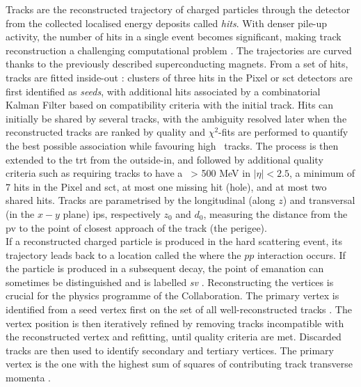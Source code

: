 Tracks are the reconstructed trajectory of charged particles through the detector from the collected localised energy deposits called \textit{hits}. With denser pile-up activity, the number of hits in a single event becomes significant, making track reconstruction a challenging computational problem \cite{ATL-PHYS-PUB-2015-006, ATLAS-tracks-algo,}. The trajectories are curved thanks to the previously described superconducting magnets. From a set of hits, tracks are fitted inside-out \cite{ATLAS-tracks-algo}: clusters of three hits in the Pixel or \gls{sct} detectors are first identified as \textit{seeds}, with additional hits associated by a combinatorial Kalman Filter \cite{10.1115/1.3662552} based on compatibility criteria with the initial track. Hits can initially be shared by several tracks, with the ambiguity resolved later when the reconstructed tracks are ranked by quality and $\chi^2$-fits are performed to quantify the best possible association while favouring high \pt\ tracks. The process is then extended to the \gls{trt} from the outside-in, and followed by additional quality criteria such as requiring tracks to have a \pt\ > 500 MeV in $|\eta| < 2.5$, a minimum of 7 hits in the Pixel and \gls{sct}, at most one missing hit (hole), and at most two shared hits. Tracks are parametrised by the longitudinal (along $z$) and transversal (in the $x-y$ plane) \glspl{ip}, respectively $z_0$ and $d_0$, measuring the distance from the \gls{pv} to the point of closest approach of the track (the perigee). \\

If a reconstructed charged particle is produced in the hard scattering event, its trajectory leads back to a location called the \textit{} \cite{ATLAS:2016nnj} where the $pp$ interaction occurs. If the particle is produced in a subsequent decay, the point of emanation can sometimes be distinguished and is labelled \textit{\gls{sv}} \cite{Kostyukhin:685551}. Reconstructing the vertices is crucial for the physics programme of the Collaboration. The primary vertex is identified from a seed vertex first on the set of all well-reconstructed tracks \cite{ATL-PHYS-PUB-2015-026}. The vertex position is then iteratively refined by removing tracks incompatible with the reconstructed vertex and refitting, until quality criteria are met. Discarded tracks are then used to identify secondary and tertiary vertices. The primary vertex is the one with the highest sum of squares of contributing track transverse momenta \pt. \\

